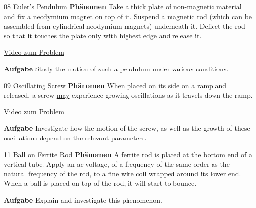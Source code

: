 \documentclass[9pt]{beamer}
\begin{document}
\begin{frame}{08 Euler's Pendulum}
\textbf{Phänomen} Take a thick plate of non-magnetic material and fix a neodymium magnet on top of it. Suspend a magnetic rod (which can be assembled from cylindrical neodymium magnets) underneath it. Deflect the rod so that it touches the plate only with highest edge and release it.

\vfill
\begin{center}
\color{blue}\href{https://www.youtube.com/watch?v=opWY6s0e9Yo}{Video zum Problem}\color{black}
\end{center}
\vfill
\textbf{Aufgabe} Study the \color{blue}motion \color{black} of such a pendulum under various \color{orange}conditions\color{black}.
\end{frame}

\begin{frame}{09 Oscillating Screw}
\textbf{Phänomen} When placed on its side on a ramp and released, a screw \underline{may} experience growing oscillations as it travels down the ramp.
\vfill
\begin{center}
\color{blue}\href{https://youtu.be/iwerWvbOyoE}{Video zum Problem}\color{black}
\end{center}
\vfill
\textbf{Aufgabe} Investigate how the \color{blue}motion \color{black} of the screw, as well as the \color{blue}growth \color{black} of these oscillations depend on the \color{orange}relevant parameters\color{black}.
\end{frame}

\begin{frame}{11 Ball on Ferrite Rod}
\textbf{Phänomen} A ferrite rod is placed at the bottom end of a vertical tube. Apply an ac voltage, of a frequency of the same order as the natural frequency of the rod, to a fine wire coil wrapped around its lower end. When a ball is placed on top of the rod, it will start to bounce. 

\vfill
\begin{center}
\end{center}
\par
\vfill

\textbf{Aufgabe} Explain and investigate this phenomenon.
\end{frame}
\end{document}
